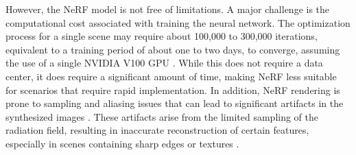 However, the NeRF model is not free of limitations. A major challenge is the computational cost associated with training the neural network. The optimization process for a single scene may require about 100,000 to 300,000 iterations, equivalent to a training period of about one to two days, to converge, assuming the use of a single NVIDIA V100 GPU \citep{mildenhallNERF}. While this does not require a data center, it does require a significant amount of time, making NeRF less suitable for scenarios that require rapid implementation. In addition, NeRF rendering is prone to sampling and aliasing issues that can lead to significant artifacts in the synthesized images \citep{rabby2023beyondpixels}. These artifacts arise from the limited sampling of the radiation field, resulting in inaccurate reconstruction of certain features, especially in scenes containing sharp edges or textures \citep{rabby2023beyondpixels}.
